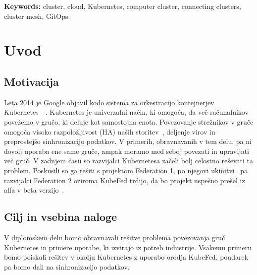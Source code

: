 \documentclass[a4paper, 12pt]{book}
\newcommand{\tkeywordsEn}{cluster, cloud, Kubernetes, computer cluster, connecting clusters, cluster mesh, GitOps}
\newcommand{\clearemptydoublepage}{\newpage{\pagestyle{empty}\cleardoublepage}}
\begin{document}
\bigskip
\noindent\textbf{Keywords:} \tkeywordsEn.
\clearemptydoublepage
\mainmatter
\setcounter{page}{1}
\pagestyle{fancy}
\chapter{Uvod}
\label{uvod}
\section{Motivacija}
Leta 2014 je Google objavil kodo sistema za orkestracijo kontejnerjev Kubernetes~\cite{what-is-Kubernetes}~\cite{borg-omega-kubernetes}.
Kubernetes  je univerzalni način, ki omogoča, da več računalnikov povežemo v gručo, ki deluje kot samostojna enota. 
Povezovanje strežnikov v gruče omogoča visoko razpoložljivost (HA) naših storitev~\cite{mastering-kubernetes}, deljenje virov in preprostejšo sinhronizacijo podatkov.
V primerih, obravnavanih v tem delu, pa ni dovolj uporaba ene same gruče, ampak moramo med seboj povezati in upravljati več gruč.
V zadnjem času so razvijalci Kubernetesa začeli bolj celostno reševati ta problem.
Poskusili so ga rešiti s projektom Federation 1, po njegovi ukinitvi~\cite{kubernetes-federation-evolution} pa razvijalci Federation 2 oziroma KubeFed trdijo, da bo projekt uspešno prešel iz alfa v beta verzijo~\cite{kubefed-repo}.
\section{Cilj in vsebina naloge}
V diplomskem delu bomo obravnavali rešitve problema povezovanja gruč Kubernetes in primere uporabe, ki izvirajo iz potreb industrije.
Vsakemu primeru bomo poiskali rešitev v okolju Kubernetes z uporabo orodja KubeFed, poudarek pa bomo dali na sinhronizacijo podatkov.
\end{document}
